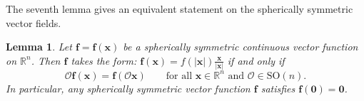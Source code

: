 \documentclass[11pt,reqno]{amsart}
\newtheorem{lem}{Lemma}[section]
\numberwithin{rk}{section}
\numberwithin{prop}{section}
\numberwithin{mydef}{section}
\numberwithin{lem}{section}
\numberwithin{equation}{section}
\numberwithin{thm}{section}
\begin{document}
The seventh lemma gives an equivalent statement on the spherically symmetric vector fields.
\begin{lem}\label{rmk31}
Let $\boldsymbol{f}=\boldsymbol{f}(\boldsymbol{x})$ be a spherically symmetric  continuous vector function on $\mathbb{R}^n$. Then $\boldsymbol{f}$ takes the form{\rm :} $\boldsymbol{f}(\boldsymbol{x})=f(|\boldsymbol{x}|)\frac{\boldsymbol{x}}{|\boldsymbol{x}|}$ if and only if 
\begin{equation}\label{dengjia}
\mathcal{O}\boldsymbol{f}(\boldsymbol{x})=\boldsymbol{f}(\mathcal{O}\boldsymbol{x}) \qquad \text{for all $\boldsymbol{x}\in \mathbb{R}^n$ and $\mathcal{O}\in \mathrm{SO}(n)$}.
\end{equation}
In particular, any spherically symmetric  vector  function $\boldsymbol{f}$ satisfies $\boldsymbol{f}(\boldsymbol{0})=\boldsymbol{0}$.
\end{lem}
\end{document}
